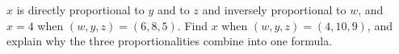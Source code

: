 $x$ is directly proportional to $y$ and to $z$ and inversely proportional to $w$, and $x=4$ when $(w,y,z)=(6,8,5)$. Find $x$ when $(w,y,z)=(4,10,9)$, and explain why the three proportionalities combine into one formula.
